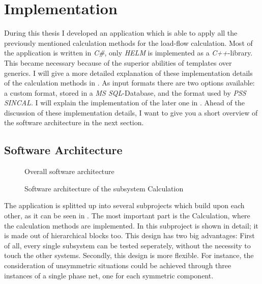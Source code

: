 \chapter{Implementation}
During this thesis I developed an application which is able to apply all the previously mentioned calculation methods for the load-flow calculation. Most of the application is written in \emph{C\#}, only \emph{HELM} is implemented as a \emph{C++}-library. This became necessary because of the superior abilities of templates over generics. I will give a more detailed explanation of these implementation details of the calculation methods in .
As input formats there are two options available: a custom format, stored in a \emph{MS SQL}-Database, and the format used by \emph{PSS SINCAL}. I will explain the implementation of the later one in . Ahead of the discussion of these implementation details, I want to give you a short overview of the software architecture in the next section.

\section{Software Architecture}

\begin{figure}
	\centering
	
	\caption{Overall software architecture}
	\label{fig:software_architecture}
\end{figure}

\begin{figure}
	\centering
	
	\caption{Software architecture of the subsystem Calculation}
	\label{fig:calculation_architecture}
\end{figure}

The application is splitted up into several subprojects which build upon each other, as it can be seen in . The most important part is the Calculation, where the calculation methods are implemented. In  this subproject is shown in detail; it is made out of hierarchical blocks too. This design has two big advantages: First of all, every single subsystem can be tested seperately, without the necessity to touch the other systems. Secondly, this design is more flexible. For instance, the consideration of unsymmetric situations could be achieved through three instances of a single phase net, one for each symmetric component.

